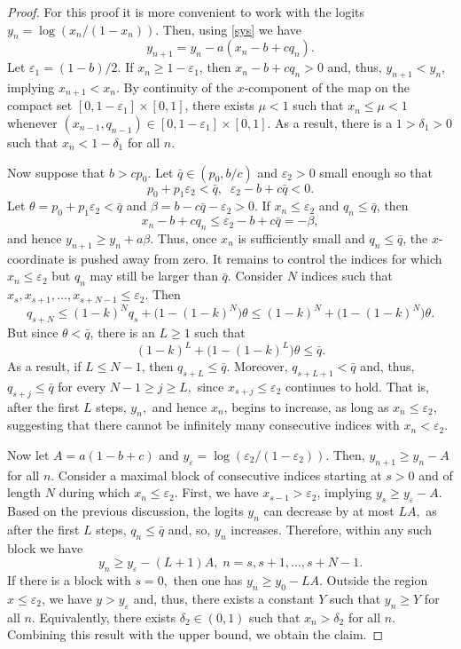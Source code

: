 \documentclass{article}
\theoremstyle{plain}
\theoremstyle{definition}
\begin{document}
\begin{proof}
For this proof it is more convenient to work with the logits $y_n=\log \left(x_n/(1-x_n) \right).$ Then, using \eqref{sys} we have
\[
y_{n+1}=y_n-a(x_n-b+cq_n).
\]
Let $\varepsilon_1=(1-b)/2.$ If \(x_n\geq 1-\varepsilon_1\), then $x_n-b+cq_n>0$ and, thus, $y_{n+1}<y_n$, implying $x_{n+1}<x_n.$ By continuity of the \(x\)-component of the map on the compact set \([0,1-\varepsilon_1]\times[0,1]\), there exists \(\mu<1\) such that  $x_n\leq \mu<1$ whenever $(x_{n-1},q_{n-1})\in[0,1-\varepsilon_1]\times[0,1]$. As a result, there is a $1>\delta_1>0$ such that $x_n<1-\delta_1$ for all $n.$

Now suppose that $b>cp_0.$ Let $\bar q\in(p_0,b/c)$ and \(\varepsilon_2>0\) small enough so that 
\[
p_0+p_1\varepsilon_2<\bar q, \; \; \varepsilon_2 - b + c\bar q<0.
\]
Let $\theta=p_0+p_1\varepsilon_2<\bar q$ and $\beta=b-c\bar q-\varepsilon_2>0$. If \(x_n\leq\varepsilon_2\) and \(q_n\leq\bar q\), then
\[
x_n-b+cq_n\leq \varepsilon_2 - b+c\bar q=-\beta,
\]
and hence $y_{n+1}\geq y_n+a\beta.$ Thus, once \(x_n\) is sufficiently small and \(q_n\leq\bar q\), the \(x\)-coordinate is pushed away from zero. It remains to control the indices for which \(x_n\leq\varepsilon_2\) but \(q_n\) may still be larger than \(\bar q\). Consider $N$ indices such that \(x_s,x_{s+1},\ldots,x_{s+N-1}\leq\varepsilon_2\). Then 
\[
q_{s+N}
\leq
(1-k)^N q_s+\bigl(1-(1-k)^N\bigr)\theta
\leq
(1-k)^N+\bigl(1-(1-k)^N\bigr)\theta.
\]
But since \(\theta<\bar q\), there is an $L\geq 1$ such that 
\[
(1-k)^L+\bigl(1-(1-k)^L\bigr)\theta\leq \bar q.
\]
As a result, if $L\leq N-1$, then \(q_{s+L}\leq\bar q\). Moreover, $q_{s+L+1}< \bar q$ and, thus, $q_{s+j}\leq \bar q$ for every $N-1\geq j\geq L,$ since $x_{s+j}\leq \varepsilon_2$ continues to hold. That is, after the first $L$ steps, $y_n,$ and hence $x_n$, begins to increase, as long as $x_n\leq \varepsilon_2$, suggesting that there cannot be infinitely many consecutive indices with $x_n<\varepsilon_2$.

Now let $A=a(1-b+c)$ and $y_{\varepsilon}=\log \left( \varepsilon_2/( 1-\varepsilon_2) \right)$. Then, $y_{n+1}\geq y_n-A$ for all $n$. Consider a maximal block of consecutive indices starting at $s>0$ and of length $N$ during which \(x_n\leq\varepsilon_2\). First, we have $x_{s-1}>\varepsilon_2$, implying $y_s\geq y_{\varepsilon}-A$. Based on the previous discussion, the logits $y_n$ can decrease by at most $LA,$ as after the first $L$ steps, $q_n \leq \bar q$ and, so, $y_n$ increases. Therefore, within any such block we have
\[
y_{n} \geq y_\varepsilon-(L+1)A,\; n=s,s+1,\dots,s+N-1.
\]
If there is a block with $s=0,$ then one has $y_n\geq y_0-LA.$ Outside the region \(x\leq\varepsilon_2\), we have \(y>y_{\varepsilon}\) and, thus, there exists a constant $Y$ such that $y_n\geq Y$ for all $n.$ Equivalently, there exists $\delta_2 \in(0,1)$ such that $x_n > \delta_2$ for all $n$. Combining this result with the upper bound, we obtain the claim.

\end{proof}
\end{document}
